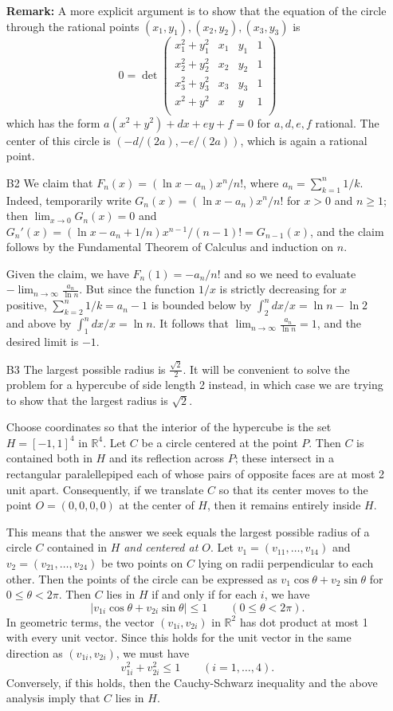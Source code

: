 \documentclass[amssymb,twocolumn,pra,10pt,aps]{revtex4-1}
\newcommand{\RR}{\mathbb{R}}
\begin{document}
\begin{itemize}
\textbf{Remark:} A more explicit argument is to show that the equation of
the circle through the rational points $(x_1, y_1), (x_2, y_2), (x_3, y_3)$ is
\[
0 = \det \begin{pmatrix}
x_1^2 + y_1^2 & x_1 & y_1 & 1 \\
x_2^2 + y_2^2 & x_2 & y_2 & 1 \\
x_3^2 + y_3^2 & x_3 & y_3 & 1 \\
x^2 + y^2 & x & y & 1 \\
\end{pmatrix}
\]
which has the form $a(x^2+y^2) + dx + ey + f = 0$ for $a,d,e,f$ rational.
The center of this circle is $(-d/(2a), -e/(2a))$, which is again a rational
point.

\item[B2]
We claim that $F_n(x) = (\ln x-a_n)x^n/n!$, where $a_n = \sum_{k=1}^n 1/k$. Indeed, temporarily write $G_n(x) = (\ln x-a_n)x^n/n!$ for $x>0$ and $n\geq 1$; then $\lim_{x\to 0} G_n(x) = 0$ and $G_n'(x) = (\ln x-a_n+1/n) x^{n-1}/(n-1)! = G_{n-1}(x)$, and the claim follows by the Fundamental Theorem of Calculus and induction on $n$.

Given the claim, we have $F_n(1) = -a_n/n!$ and so we need to evaluate $-\lim_{n\to\infty} \frac{a_n}{\ln n}$. But since the function $1/x$ is strictly decreasing for $x$ positive, $\sum_{k=2}^n 1/k = a_n-1$ is bounded below by $\int_2^n dx/x = \ln n-\ln 2$ and above by $\int_1^n dx/x=\ln n$. It follows that $\lim_{n\to\infty} \frac{a_n}{\ln n} = 1$, and the desired limit is $-1$.

\item[B3]
The largest possible radius is $\frac{\sqrt{2}}{2}$.
It will be convenient to solve
the problem for a hypercube of side length 2 instead, in which case
we are trying to show that the largest radius is $\sqrt{2}$.

Choose coordinates so that the interior of the hypercube
is the set $H = [-1,1]^4$ in $\RR^4$. Let $C$ be a circle
centered at the point $P$. Then $C$ is contained both in $H$
and its reflection across $P$; these intersect in a rectangular
paralellepiped each of whose pairs of opposite faces are at most
2 unit apart. Consequently, if we translate $C$ so that its center
moves to the point $O = (0,0,0,0)$ at the center of $H$,
then it remains entirely inside $H$.

This means that the answer we seek equals the largest possible radius
of a circle $C$ contained in $H$ \emph{and centered at $O$}.
Let $v_1 = (v_{11}, \dots, v_{14})$ and $v_2 = (v_{21},\dots,v_{24})$
be two points on $C$ lying on radii perpendicular to each other.
Then the points of the circle can be expressed as
$v_1 \cos \theta + v_2 \sin \theta$ for $0 \leq \theta < 2\pi$.
Then $C$ lies in $H$ if and only if for each $i$, we have
\[
|v_{1i} \cos \theta + v_{2i} \sin \theta|
\leq 1 \qquad (0 \leq \theta < 2\pi).
\]
In geometric terms, the vector $(v_{1i}, v_{2i})$ in $\RR^2$
has dot product at most 1 with every unit vector. Since this holds
for the unit vector in the same direction as
$(v_{1i}, v_{2i})$, we must have
\[
v_{1i}^2 + v_{2i}^2 \leq 1 \qquad (i=1,\dots,4).
\]
Conversely, if this holds, then the Cauchy-Schwarz inequality
and the above analysis imply that $C$ lies in $H$.


\end{itemize}
\end{document}

